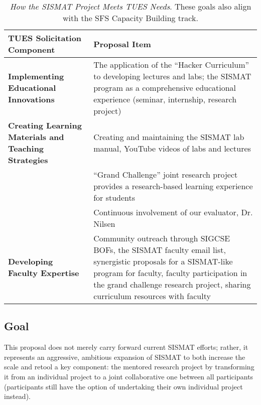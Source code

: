 \begin{table}[ht]
\begin{center}
\begin{tabular}{| p{2in} | p{3.5in} |}
\hline
  {\bf TUES Solicitation Component} & {\bf Proposal Item} \\
\hline\hline
  \raggedright {\bf Implementing Educational Innovations} & The application of the ``Hacker Curriculum'' to developing lectures and labs; the SISMAT program as a comprehensive educational experience (seminar, internship, research project)\\
  \hline
  \raggedright {\bf Creating Learning Materials and Teaching Strategies} & 
   Creating and maintaining the SISMAT lab manual, YouTube videos of labs and lectures\\
\hline
\eat{
  \raggedright {\bf Research on Undergraduate STEM Teaching and Learning} & ``Grand Challenge'' joint research project provides a research-based learning experience for students\\
  \hline} %
  \raggedright {\bf Assessing Learning and Evaluating Innovations} & 
  Continuous involvement of our evaluator, Dr. Nilsen\\
  \hline
  \raggedright {\bf Developing Faculty Expertise} & Community outreach 
   through SIGCSE BOFs, the SISMAT faculty email list, synergistic proposals for a SISMAT-like program for faculty, faculty participation in the grand challenge research project, sharing curriculum resources with faculty\\
  \hline

\end{tabular}
\end{center}
\caption{{\em How the SISMAT Project Meets TUES Needs}. These goals also align with the SFS Capacity Building track.}
\label{table:TUES}
\end{table}

\subsection{Goal} 

This proposal does not merely carry forward current SISMAT efforts;
rather, it represents an aggressive, ambitious expansion of SISMAT to
both increase the scale and retool a key component: the mentored
research project by transforming it from an individual project to a
joint collaborative one between all participants (participants still
have the option of undertaking their own individual project instead).

